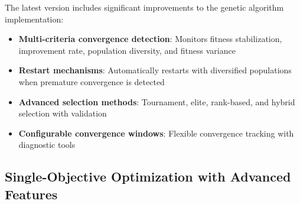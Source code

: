 \documentclass[
]{article}
\providecommand{\tightlist}{%
  \setlength{\itemsep}{0pt}\setlength{\parskip}{0pt}}
\begin{document}
The latest version includes significant improvements to the genetic
algorithm implementation:

\begin{itemize}
\tightlist
\item
  \textbf{Multi-criteria convergence detection}: Monitors fitness
  stabilization, improvement rate, population diversity, and fitness
  variance
\item
  \textbf{Restart mechanisms}: Automatically restarts with diversified
  populations when premature convergence is detected
\item
  \textbf{Advanced selection methods}: Tournament, elite, rank-based,
  and hybrid selection with validation
\item
  \textbf{Configurable convergence windows}: Flexible convergence
  tracking with diagnostic tools
\end{itemize}

\subsection{Single-Objective Optimization with Advanced
Features}\label{single-objective-optimization-with-advanced-features}
\end{document}
